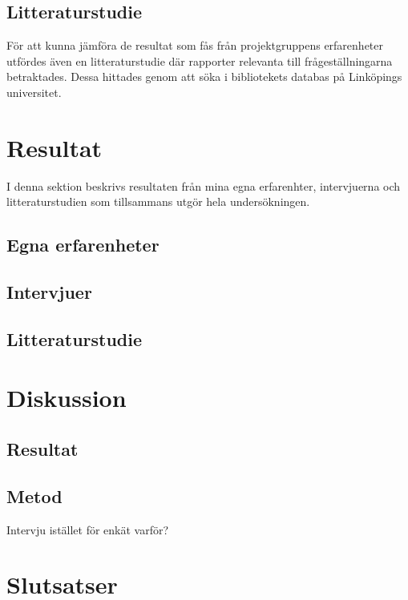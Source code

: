 \subsection{Litteraturstudie}
För att kunna jämföra de resultat som fås från projektgruppens erfarenheter utfördes även en litteraturstudie där rapporter relevanta till frågeställningarna betraktades. Dessa hittades genom att söka i bibliotekets databas på Linköpings universitet. 

\section{Resultat}
I denna sektion beskrivs resultaten från mina egna erfarenhter, intervjuerna och litteraturstudien som tillsammans utgör hela undersökningen.
\subsection{Egna erfarenheter}
\subsection{Intervjuer}
\subsection{Litteraturstudie}
\section{Diskussion}
\subsection{Resultat}
\subsection{Metod}
Intervju istället för enkät varför?
\section{Slutsatser}



